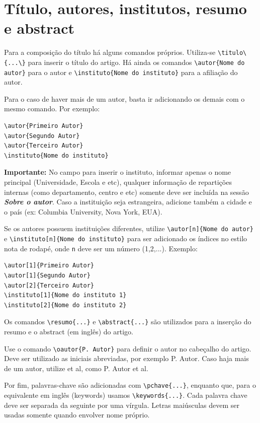 \documentclass{cda}
\begin{document}
\section{Título, autores, institutos, resumo e abstract}
Para a composição do título há alguns comandos próprios. Utiliza-se \verb|\titulo\{...\}| para inserir o título do artigo. Há ainda os comandos \verb|\autor{Nome do autor}| para o autor e \verb|\instituto{Nome do instituto}| para a afiliação do autor. 


Para o caso de haver mais de um autor, basta ir adicionando os demais com o mesmo comando. Por exemplo:
\begin{verbatim}
\autor{Primeiro Autor}
\autor{Segundo Autor}
\autor{Terceiro Autor}
\instituto{Nome do instituto}
\end{verbatim}
\textbf{Importante:} No campo para inserir o instituto, informar apenas o nome principal (Universidade, Escola e etc), qualquer informação de repartições internas (como departamento, centro e etc) somente deve ser incluída na sessão \textbf{\textit{Sobre o autor}}. Caso a instituição seja estrangeira, adicione também a cidade e o país (ex: Columbia University, Nova York, EUA).
	
Se os autores possuem instituições diferentes, utilize \verb|\autor[n]{Nome do autor}| e \verb|\instituto[n]{Nome do instituto}| para ser adicionado os índices no estilo nota de rodapé, onde \verb|n| deve ser um número (1,2,...). Exemplo:
\begin{verbatim}
\autor[1]{Primeiro Autor}
\autor[1]{Segundo Autor}
\autor[2]{Terceiro Autor}
\instituto[1]{Nome do instituto 1}
\instituto[2]{Nome do instituto 2}
\end{verbatim}
	
Os comandos \verb|\resumo{...}| e \verb|\abstract{...}| são utilizados para a inserção do resumo e o abstract (em inglês) do artigo.

Use o comando \verb|\oautor{P. Autor}| para definir o autor no cabeçalho do artigo. Deve ser utilizado as iniciais abreviadas, por exemplo P. Autor. Caso haja mais de um autor, utilize et al, como P. Autor et al.

Por fim, palavras-chave são adicionadas com \verb|\pchave{...}|, enquanto que, para o equivalente em inglês (keywords) usamos \verb|\keywords{...}|. Cada palavra chave deve ser separada da seguinte por uma vírgula. Letras maiúsculas devem ser usadas somente quando envolver nome próprio.
\end{document}

